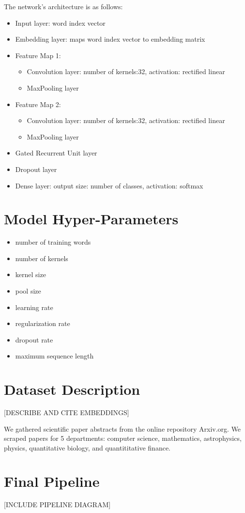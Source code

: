 The network's architecture is as follows:
\begin{itemize}
  \item Input layer: word index vector
  \item Embedding layer: maps word index vector to embedding matrix
  \item Feature Map 1:
      \begin{itemize}
        \item Convolution layer: number of kernels:32, activation: rectified linear
        \item MaxPooling layer
      \end{itemize}
\item Feature Map 2:
    \begin{itemize}
      \item Convolution layer: number of kernels:32, activation: rectified linear
      \item MaxPooling layer
    \end{itemize}
\item Gated Recurrent Unit layer
\item Dropout layer
\item Dense layer: output size: number of classes, activation: softmax
\end{itemize}

\section{Model Hyper-Parameters}
\begin{itemize}
  \item number of training words
  \item number of kernels
  \item kernel size
  \item pool size
  \item learning rate
  \item regularization rate
  \item dropout rate
  \item maximum sequence length

\end{itemize}

\section{Dataset Description}
[DESCRIBE AND CITE EMBEDDINGS]

We gathered scientific paper abstracts from the online repository Arxiv.org.
We scraped papers for 5 departments: computer science, mathematics, astrophysics, physics, quantitative biology, and quantititative finance.

\section{Final Pipeline}
[INCLUDE PIPELINE DIAGRAM]
